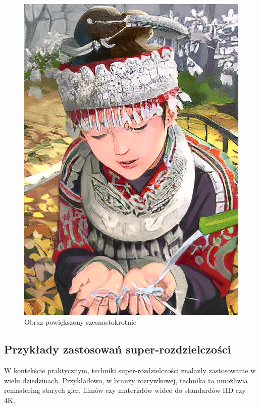 \begin{figure}[ht]
\begin{minipage}[t]{0.3\linewidth}
        \includegraphics[width=\linewidth]{Rozdziały/02.Podstawy_teoretyczne/Obrazy/comic_ESRGAN_x16.png}
        \caption{Obraz powiększony szesnastokrotnie}
        \label{fig:image3}
    \end{minipage}
\end{figure}

\subsection*{Przykłady zastosowań super-rozdzielczości}

W kontekście praktycznym, techniki super-rozdzielczości znalazły zastosowanie w wielu dziedzinach. Przykładowo, w branży rozrywkowej, technika ta umożliwia remastering starych gier, filmów czy materiałów wideo do standardów HD czy 4K.

